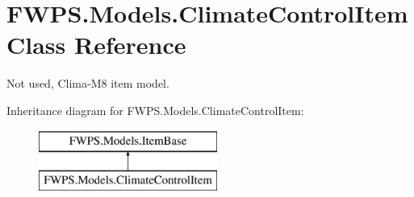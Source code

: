 \hypertarget{class_f_w_p_s_1_1_models_1_1_climate_control_item}{}\section{F\+W\+P\+S.\+Models.\+Climate\+Control\+Item Class Reference}
\label{class_f_w_p_s_1_1_models_1_1_climate_control_item}


Not used, Clima-\/\+M8 item model.  


Inheritance diagram for F\+W\+P\+S.\+Models.\+Climate\+Control\+Item\+:\begin{figure}[H]
\begin{center}
\leavevmode
\includegraphics[height=2.000000cm]{class_f_w_p_s_1_1_models_1_1_climate_control_item}
\end{center}
\end{figure}
